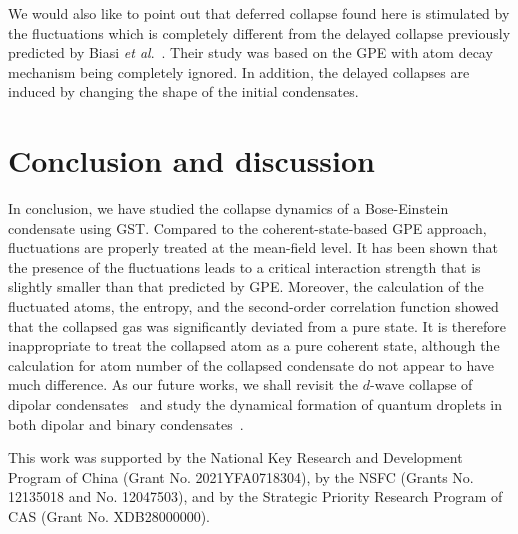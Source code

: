 \documentclass[pra,twocolumn,preprintnumbers,superscriptaddress,longbibliography,showkeys]{revtex4-1}
\begin{document}
We would also like to point out that deferred collapse found here is stimulated by the fluctuations which is completely different from the delayed collapse previously predicted by Biasi {\it et al}.~\cite{delayedcoll}. Their study was based on the GPE with atom decay mechanism being completely ignored. In addition, the delayed collapses are induced by changing the shape of the initial condensates.

\section{C\lowercase{onclusion and discussion}}\label{secconcl}
In conclusion, we have studied the collapse dynamics of a Bose-Einstein condensate using GST. Compared to the coherent-state-based GPE approach, fluctuations are properly treated at the mean-field level. It has been shown that the presence of the fluctuations leads to a critical interaction strength that is slightly smaller than that predicted by GPE. Moreover, the calculation of the fluctuated atoms, the entropy, and the second-order correlation function showed that the collapsed gas was significantly deviated from a pure state. It is therefore inappropriate to treat the collapsed atom as a pure coherent state, although the calculation for atom number of the collapsed condensate do not appear to have much difference. As our future works, we shall revisit the $d$-wave collapse of dipolar condensates~\cite{dwavecollapse} and study the dynamical formation of quantum droplets in both dipolar and binary condensates~\cite{singledropDy,Cabrera}.

\begin{acknowledgments}
This work was supported by the National Key Research and Development Program of China (Grant No. 2021YFA0718304), by the NSFC (Grants No. 12135018 and No. 12047503), and by the Strategic Priority Research Program of CAS (Grant No. XDB28000000).
\end{acknowledgments}


\end{document}
